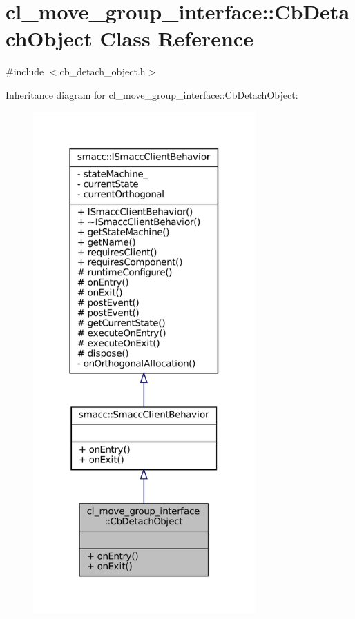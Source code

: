 \hypertarget{classcl__move__group__interface_1_1CbDetachObject}{}\section{cl\+\_\+move\+\_\+group\+\_\+interface\+:\+:Cb\+Detach\+Object Class Reference}
\label{classcl__move__group__interface_1_1CbDetachObject}


{\ttfamily \#include $<$cb\+\_\+detach\+\_\+object.\+h$>$}



Inheritance diagram for cl\+\_\+move\+\_\+group\+\_\+interface\+:\+:Cb\+Detach\+Object\+:
\nopagebreak
\begin{figure}[H]
\begin{center}
\leavevmode
\includegraphics[width=241pt]{classcl__move__group__interface_1_1CbDetachObject__inherit__graph}
\end{center}
\end{figure}


